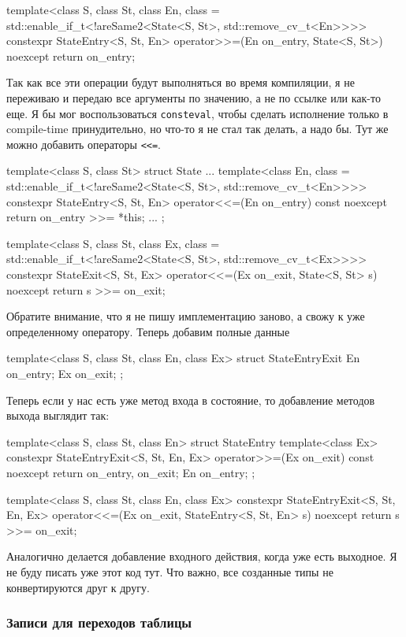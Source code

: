 \documentclass{article}
\begin{document}
{\begin{cppcode}[\nonumbers]
template<class S, class St, class En,
         class = std::enable_if_t<!areSame2<State<S, St>, std::remove_cv_t<En>>>>
constexpr StateEntry<S, St, En> operator>>=(En on_entry, State<S, St>) noexcept {
  return {on_entry};
}
\end{cppcode}
Так как все эти операции будут выполняться во время компиляции, я не переживаю и передаю все аргументы по значению, а не по ссылке или как-то еще.
Я бы мог воспользоваться \verb"consteval", чтобы сделать исполнение только в compile-time принудительно, но что-то я не стал так делать, а надо бы.
Тут же можно добавить операторы \verb"<<=".
\begin{cppcode}[\nonumbers]
template<class S, class St>
struct State {
  ...
  template<class En, class = std::enable_if_t<!areSame2<State<S, St>, std::remove_cv_t<En>>>>
  constexpr StateEntry<S, St, En> operator<<=(En on_entry) const noexcept {
    return on_entry >>= *this;
  }
  ...
};

template<class S, class St, class Ex,
         class = std::enable_if_t<!areSame2<State<S, St>, std::remove_cv_t<Ex>>>>
constexpr StateExit<S, St, Ex> operator<<=(Ex on_exit, State<S, St> s) noexcept {
  return s >>= on_exit;
}
\end{cppcode}
Обратите внимание, что я не пишу имплементацию заново, а свожу к уже определенному оператору.
Теперь добавим полные данные
\begin{cppcode}[\nonumbers]
template<class S, class St, class En, class Ex>
struct StateEntryExit {
  En on_entry;
  Ex on_exit;
};
\end{cppcode}
Теперь если у нас есть уже метод входа в состояние, то добавление методов выхода выглядит так:
\begin{cppcode}[\nonumbers]
template<class S, class St, class En>
struct StateEntry {
  template<class Ex>
  constexpr StateEntryExit<S, St, En, Ex>
  operator>>=(Ex on_exit) const noexcept {
    return {on_entry, on_exit};
  }
  En on_entry;
};

template<class S, class St, class En, class Ex>
constexpr StateEntryExit<S, St, En, Ex>
operator<<=(Ex on_exit, StateEntry<S, St, En> s) noexcept {
  return s >>= on_exit;
}
\end{cppcode}
Аналогично делается добавление входного действия, когда уже есть выходное.
Я не буду писать уже этот код тут.
Что важно, все созданные типы не конвертируются друг к другу.




\subsubsection{Записи для переходов таблицы}

}
\end{document}
